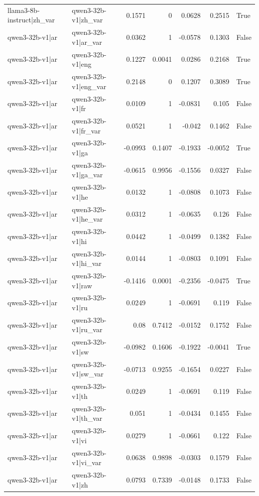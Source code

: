 \begin{table}
\begin{tabular}{l l r r r r l}
llama3-8b-instruct|zh_var & qwen3-32b-v1|zh_var & 0.1571 & 0 & 0.0628 & 0.2515 & True \\
qwen3-32b-v1|ar & qwen3-32b-v1|ar_var & 0.0362 & 1 & -0.0578 & 0.1303 & False \\
qwen3-32b-v1|ar & qwen3-32b-v1|eng & 0.1227 & 0.0041 & 0.0286 & 0.2168 & True \\
qwen3-32b-v1|ar & qwen3-32b-v1|eng_var & 0.2148 & 0 & 0.1207 & 0.3089 & True \\
qwen3-32b-v1|ar & qwen3-32b-v1|fr & 0.0109 & 1 & -0.0831 & 0.105 & False \\
qwen3-32b-v1|ar & qwen3-32b-v1|fr_var & 0.0521 & 1 & -0.042 & 0.1462 & False \\
qwen3-32b-v1|ar & qwen3-32b-v1|ga & -0.0993 & 0.1407 & -0.1933 & -0.0052 & True \\
qwen3-32b-v1|ar & qwen3-32b-v1|ga_var & -0.0615 & 0.9956 & -0.1556 & 0.0327 & False \\
qwen3-32b-v1|ar & qwen3-32b-v1|he & 0.0132 & 1 & -0.0808 & 0.1073 & False \\
qwen3-32b-v1|ar & qwen3-32b-v1|he_var & 0.0312 & 1 & -0.0635 & 0.126 & False \\
qwen3-32b-v1|ar & qwen3-32b-v1|hi & 0.0442 & 1 & -0.0499 & 0.1382 & False \\
qwen3-32b-v1|ar & qwen3-32b-v1|hi_var & 0.0144 & 1 & -0.0803 & 0.1091 & False \\
qwen3-32b-v1|ar & qwen3-32b-v1|raw & -0.1416 & 0.0001 & -0.2356 & -0.0475 & True \\
qwen3-32b-v1|ar & qwen3-32b-v1|ru & 0.0249 & 1 & -0.0691 & 0.119 & False \\
qwen3-32b-v1|ar & qwen3-32b-v1|ru_var & 0.08 & 0.7412 & -0.0152 & 0.1752 & False \\
qwen3-32b-v1|ar & qwen3-32b-v1|sw & -0.0982 & 0.1606 & -0.1922 & -0.0041 & True \\
qwen3-32b-v1|ar & qwen3-32b-v1|sw_var & -0.0713 & 0.9255 & -0.1654 & 0.0227 & False \\
qwen3-32b-v1|ar & qwen3-32b-v1|th & 0.0249 & 1 & -0.0691 & 0.119 & False \\
qwen3-32b-v1|ar & qwen3-32b-v1|th_var & 0.051 & 1 & -0.0434 & 0.1455 & False \\
qwen3-32b-v1|ar & qwen3-32b-v1|vi & 0.0279 & 1 & -0.0661 & 0.122 & False \\
qwen3-32b-v1|ar & qwen3-32b-v1|vi_var & 0.0638 & 0.9898 & -0.0303 & 0.1579 & False \\
qwen3-32b-v1|ar & qwen3-32b-v1|zh & 0.0793 & 0.7339 & -0.0148 & 0.1733 & False \\

\end{tabular}
\end{table}
